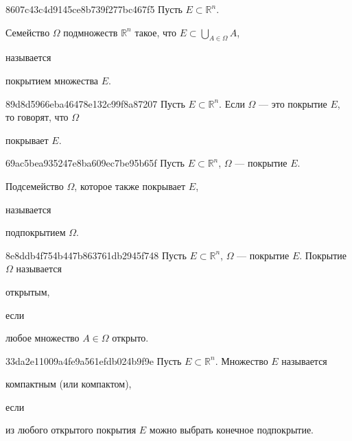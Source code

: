 \begin{note}{8607c43c4d9145ce8b739f277bc467f5}
    Пусть \({ E \subset \mathbb R^{n} }\).
    \begin{icloze}{1}Семейство \({ \Omega }\) подмножеств \({ \mathbb R^{n} }\) такое, что \({ E \subset \bigcup_{A \in \Omega}^{} A }\),\end{icloze} называется \begin{icloze}{2}покрытием множества \({ E }\).\end{icloze}
\end{note}

\begin{note}{89d8d5966eba46478e132c99f8a87207}
    Пусть \({ E \subset \mathbb R^{n} }\).
    Если \({ \Omega }\) --- это покрытие \({ E }\), то говорят, что \({ \Omega }\) \begin{icloze}{1}покрывает \({ E }\).\end{icloze}
\end{note}

\begin{note}{69ac5bea935247e8ba609ec7be95b65f}
    Пусть \({ E \subset \mathbb R^{n} }\),\: \({ \Omega }\) --- покрытие \({ E }\).
    \begin{icloze}{1}Подсемейство \({ \Omega }\), которое также покрывает \({ E }\),\end{icloze} называется \begin{icloze}{2}подпокрытием \({ \Omega }\).\end{icloze}
\end{note}

\begin{note}{8e8ddb4f754b447b863761db2945f748}
    Пусть \({ E \subset \mathbb R^{n} }\),\: \({ \Omega }\) --- покрытие \({ E }\).
    Покрытие \({ \Omega }\) называется \begin{icloze}{2}открытым,\end{icloze} если \begin{icloze}{1}любое множество \({ A \in \Omega }\) открыто.\end{icloze}
\end{note}

\begin{note}{33da2e11009a4fe9a561efdb024b9f9e}
    Пусть \({ E \subset \mathbb R^{n} }\).
    Множество \({ E }\) называется \begin{icloze}{2}компактным (или компактом),\end{icloze} если \begin{icloze}{1}из любого открытого покрытия \({ E }\) можно выбрать конечное подпокрытие.\end{icloze}
\end{note}

